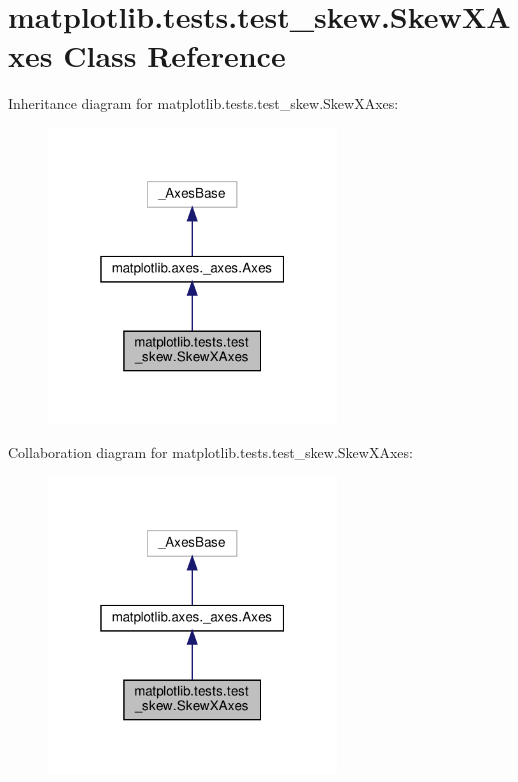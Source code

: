 \hypertarget{classmatplotlib_1_1tests_1_1test__skew_1_1SkewXAxes}{}\section{matplotlib.\+tests.\+test\+\_\+skew.\+Skew\+X\+Axes Class Reference}
\label{classmatplotlib_1_1tests_1_1test__skew_1_1SkewXAxes}


Inheritance diagram for matplotlib.\+tests.\+test\+\_\+skew.\+Skew\+X\+Axes\+:
\nopagebreak
\begin{figure}[H]
\begin{center}
\leavevmode
\includegraphics[width=217pt]{classmatplotlib_1_1tests_1_1test__skew_1_1SkewXAxes__inherit__graph}
\end{center}
\end{figure}


Collaboration diagram for matplotlib.\+tests.\+test\+\_\+skew.\+Skew\+X\+Axes\+:
\nopagebreak
\begin{figure}[H]
\begin{center}
\leavevmode
\includegraphics[width=217pt]{classmatplotlib_1_1tests_1_1test__skew_1_1SkewXAxes__coll__graph}
\end{center}
\end{figure}
